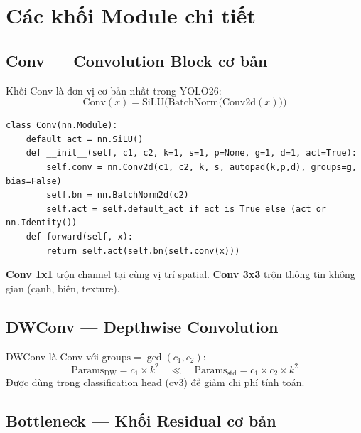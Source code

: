 \chapter{Các khối Module chi tiết}
\label{ch:modules}

\section{Conv --- Convolution Block cơ bản}

Khối Conv là đơn vị cơ bản nhất trong YOLO26:
\begin{equation}
    \text{Conv}(x) = \text{SiLU}\Big(\text{BatchNorm}\big(\text{Conv2d}(x)\big)\Big)
\end{equation}

\begin{lstlisting}[caption={Conv block trong yolo26\_modules.py}]
class Conv(nn.Module):
    default_act = nn.SiLU()
    def __init__(self, c1, c2, k=1, s=1, p=None, g=1, d=1, act=True):
        self.conv = nn.Conv2d(c1, c2, k, s, autopad(k,p,d), groups=g, bias=False)
        self.bn = nn.BatchNorm2d(c2)
        self.act = self.default_act if act is True else (act or nn.Identity())
    def forward(self, x):
        return self.act(self.bn(self.conv(x)))
\end{lstlisting}

\textbf{Conv 1x1} trộn channel tại cùng vị trí spatial. \textbf{Conv 3x3} trộn thông tin không gian (cạnh, biên, texture).

\section{DWConv --- Depthwise Convolution}

DWConv là Conv với $\text{groups} = \gcd(c_1, c_2)$:
\begin{equation}
    \text{Params}_{\text{DW}} = c_1 \times k^2 \quad \ll \quad \text{Params}_{\text{std}} = c_1 \times c_2 \times k^2
\end{equation}
Được dùng trong classification head (cv3) để giảm chi phí tính toán.

\section{Bottleneck --- Khối Residual cơ bản}
\label{sec:bottleneck}


